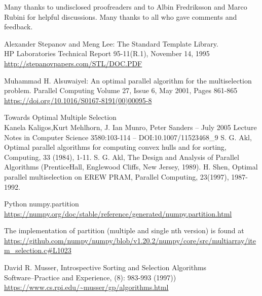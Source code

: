Many thanks to undisclosed proofreaders and to 
Albin Fredriksson and Marco Rubini for helpful discussions. Many thanks to all who gave comments and feedback.

\renewcommand{\bibname}{References}



\renewcommand{\addcontentsline}[3]{}%
\begin{thebibliography}{9}

Alexander Stepanov and Meng Lee: The Standard Template Library.\\HP Laboratories Technical Report 95-11(R.1), November 14, 1995 \\
\url{http://stepanovpapers.com/STL/DOC.PDF }

Muhammad H. Alsuwaiyel: An optimal parallel algorithm for the multiselection problem. 
Parallel Computing Volume 27, Issue 6, May 2001, Pages 861-865\\
\url{https://doi.org/10.1016/S0167-8191(00)00095-8 }

Towards Optimal Multiple Selection\\ 
Kanela Kaligos,Kurt Mehlhorn, J. Ian Munro, Peter Sanders --
July 2005 Lecture Notes in Computer Science 3580:103-114 --
DOI:10.1007/11523468_9
S. G. Akl, Optimal parallel algorithms for computing convex hulls and for sorting, Computing, 33 (1984), 1-11.
S. G. Akl, The Design and Analysis of Parallel Algorithms (PrenticeHall, Englewood Cliffs, New Jersey, 1989).
H. Shen, Optimal parallel multiselection on EREW PRAM, Parallel Computing, 23(1997), 1987-1992.

Python numpy.partition \\
\url{https://numpy.org/doc/stable/reference/generated/numpy.partition.html }

The implementation of partition (multiple and single nth version) is found at
{\footnotesize \url{https://github.com/numpy/numpy/blob/v1.20.2/numpy/core/src/multiarray/item_selection.c#L1023 }}

David R. Musser, Introspective Sorting and Selection Algorithms\\
Software--Practice and Experience, (8): 983-993 (1997))\\
\url{https://www.cs.rpi.edu/~musser/gp/algorithms.html }


\end{thebibliography}
